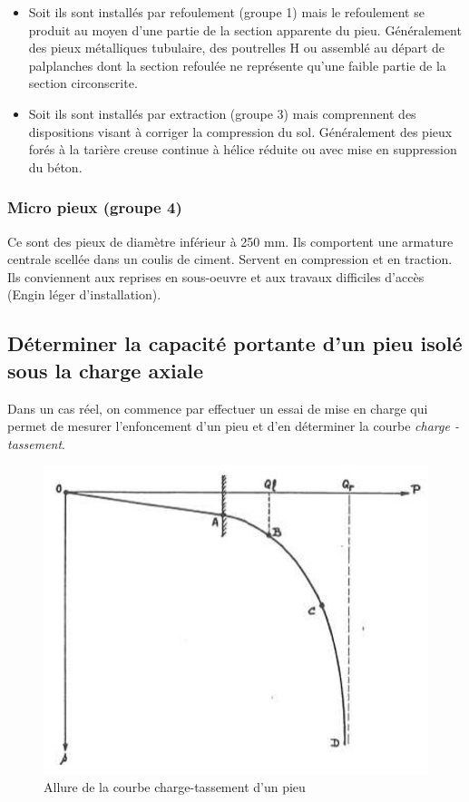         \begin{itemize}
            \item Soit ils sont installés par refoulement (groupe 1) mais le refoulement se produit au moyen d'une partie de la section apparente du pieu. Généralement des pieux métalliques tubulaire, des poutrelles H ou assemblé au départ de palplanches dont la section refoulée ne représente qu'une faible partie de la section circonscrite.
            \item Soit ils sont installés par extraction (groupe 3) mais comprennent des dispositions visant à corriger la compression du sol. Généralement des pieux forés à la tarière creuse continue à hélice réduite ou avec mise en suppression du béton.
        \end{itemize} 
        
        \subsubsection{Micro pieux (groupe 4)}
        
        Ce sont des pieux de diamètre inférieur à 250 mm. Ils comportent une armature centrale scellée dans un coulis de ciment. Servent en compression et en traction. Ils conviennent aux reprises en sous-oeuvre et aux travaux difficiles d'accès (Engin léger d'installation). 
        
    \subsection{Déterminer la capacité portante d'un pieu isolé sous la charge axiale}
    
        Dans un cas réel, on commence par effectuer un essai de mise en charge qui permet de mesurer l'enfoncement d'un pieu et d'en déterminer la courbe \textit{charge - tassement}. 
        
        \begin{figure}[h!]
            \centering
            \includegraphics[scale=0.6]{Holeyman/images/H36.PNG}
            \caption{Allure de la courbe charge-tassement d’un pieu }
        \end{figure}
        
